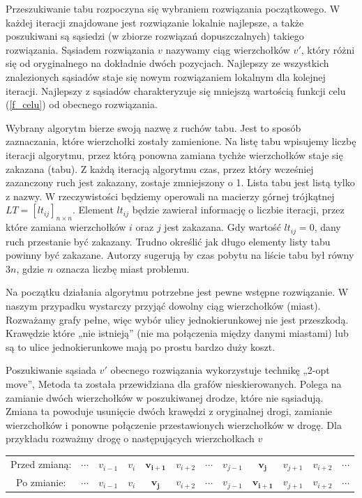 \documentclass[11pt,a4paper,twoside]{article}
\begin{document}
Przeszukiwanie tabu rozpoczyna się wybraniem rozwiązania początkowego. W każdej iteracji znajdowane jest rozwiązanie lokalnie najlepsze, a także poszukiwani są sąsiedzi (w zbiorze rozwiązań dopuszczalnych) takiego rozwiązania. Sąsiadem rozwiązania $v$ nazywamy ciąg wierzchołków $v'$, który różni się od oryginalnego na dokładnie dwóch pozycjach. Najlepszy ze wszystkich znalezionych sąsiadów staje się nowym rozwiązaniem lokalnym dla kolejnej iteracji. Najlepszy z sąsiadów charakteryzuje się mniejszą wartością funkcji celu (\ref{f_celu}) od obecnego rozwiązania.

Wybrany algorytm bierze swoją nazwę z ruchów tabu. Jest to sposób zaznaczania, które wierzchołki zostały zamienione. Na listę tabu wpisujemy liczbę iteracji algorytmu, przez którą ponowna zamiana tychże wierzchołków staje się zakazana (tabu). Z każdą iteracją algorytmu czas, przez który wcześniej zazanczony ruch jest zakazany, zostaje zmniejszony o 1. Lista tabu jest listą tylko z nazwy. W rzeczywistości będziemy operowali na macierzy górnej trójkątnej $LT = [lt_{ij}]_{n\times n}$. Element $lt_{ij}$ będzie zawierał informację o liczbie iteracji, przez które zamiana wierzchołków $i$ oraz $j$ jest zakazana. Gdy wartość $lt_{ij} = 0$, dany ruch przestanie być zakazany. Trudno określić jak długo elementy listy tabu powinny być zakazane. Autorzy \cite{FogelHeurystyka} sugerują by czas pobytu na liście tabu był równy $3n$, gdzie $n$ oznacza liczbę miast problemu.

Na początku działania algorytmu potrzebne jest pewne wstępne rozwiązanie. W naszym przypadku wystarczy przyjąć dowolny ciąg wierzchołków (miast). Rozważamy grafy pełne, więc wybór ulicy jednokierunkowej nie jest przeszkodą. Krawędzie które „nie istnieją” (nie ma połączenia między danymi miastami) lub są to ulice jednokierunkowe mają po prostu bardzo duży koszt. 

Poszukiwanie sąsiada $v'$ obecnego rozwiązania wykorzystuje technikę „2-opt move”, Metoda ta została przewidziana dla grafów nieskierowanych. Polega na zamianie dwóch wierzchołków w poszukiwanej drodze, które nie sąsiadują. Zmiana ta powoduje usunięcie dwóch krawędzi z oryginalnej drogi, zamianie wierzchołków i ponowne połączenie przestawionych wierzchołków w drogę. Dla przykładu rozważmy drogę o następujących wierzchołkach $v$

\bgroup
\def\arraystretch{1.5}
\begin{tabular}{cccccccccccc}
Przed zmianą: & $\cdots$ & $v_{i-1}$ & $v_{i}$ & $\mathbf{v_{i+1}}$ & $v_{i+2}$ & $\cdots$ & $v_{j-1}$ & $\mathbf{v_{j}}$ & $v_{j+1}$ & $v_{i+2}$ & $\cdots$\\
Po zmianie: & $\cdots$ & $v_{i-1}$ & $v_{i}$ & $\mathbf{v_{j}}$ & $v_{i+2}$ & $\cdots$ & $v_{j-1}$ & $\mathbf{v_{i+1}}$ & $v_{j+1}$ & $v_{i+2}$ & $\cdots$\\
\end{tabular}
\egroup
\end{document}
